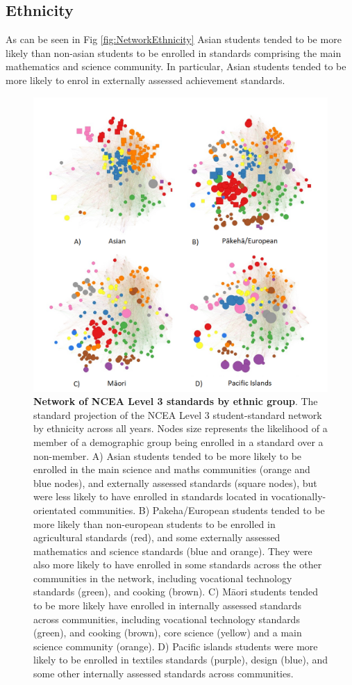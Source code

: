 \documentclass[a4paper]{article}
\begin{document}
\subsection*{Ethnicity}
As can be seen in Fig \ref{fig:NetworkEthnicity} Asian students tended to be more likely than non-asian students to be enrolled in standards comprising the main mathematics and science community. In particular, Asian students tended to be more likely to enrol in externally assessed achievement standards.   

\begin{figure}
    \centering
    \includegraphics{L3NCEA_STEM_Network_All_Ethnicity.png}
    \caption{\textbf{Network of NCEA Level 3 standards by ethnic group}. The standard projection of the NCEA Level 3 student-standard network by ethnicity across all years. Nodes size represents the likelihood of a member of a demographic group being enrolled in a standard over a non-member. A) Asian students tended to be more likely to be enrolled in the main science and maths communities (orange and blue nodes), and externally assessed standards (square nodes), but were less likely to have enrolled in standards located in vocationally-orientated communities. B) Pakeha/European students tended to be more likely than non-european students to be enrolled in agricultural standards (red), and some externally assessed mathematics and science standards (blue and orange). They were also more likely to have enrolled in some standards across the other communities in the network, including vocational technology standards (green), and cooking (brown). C) M\={a}ori students tended to be more likely have enrolled in internally assessed standards across communities, including vocational technology standards (green), and cooking (brown), core science (yellow) and a main science community (orange). D) Pacific islands students were more likely to be enrolled in textiles standards (purple), design (blue), and some other internally assessed standards across communities.
    }
    

\end{figure}
\end{document}
